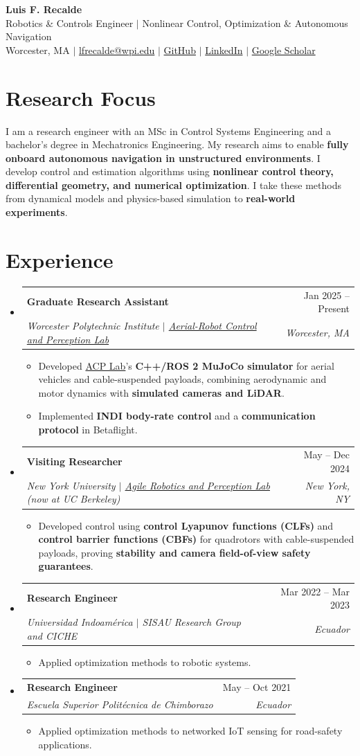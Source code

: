 \documentclass[letterpaper,11pt]{article}
\makeatletter
\newcommand{\resumeItem}[1]{
  \item {\small #1\par}\vspace{-2pt}
}
\newcommand{\resumeSubheading}[4]{
  \vspace{-2pt}\item
    \begin{tabular*}{0.97\textwidth}[t]{l@{\extracolsep{\fill}}r}
      \textbf{#1} & #2 \\
      \textit{\small#3} & \textit{\small #4} \\
    \end{tabular*}\vspace{-7pt}
}
\newcommand{\resumeSubHeadingListStart}{\begin{itemize}[leftmargin=0.15in, label={}, topsep=3pt]}
\newcommand{\resumeSubHeadingListEnd}{\end{itemize}}
\newcommand{\resumeItemListStart}{\begin{itemize}}
\newcommand{\resumeItemListEnd}{\end{itemize}\vspace{-5pt}}
\makeatother
\begin{document}
\begin{center}
\textcolor{AuthorTeal}{\textbf{\Huge Luis F. Recalde}} \\ \vspace{3pt}
\small Robotics \& Controls Engineer $|$ Nonlinear Control, Optimization \& Autonomous Navigation \\ \vspace{3pt}
Worcester, MA $|$ \href{mailto:lfrecalde@wpi.edu}{lfrecalde@wpi.edu} $|$
\href{https://github.com/lfrecalde1}{GitHub} $|$
\href{https://www.linkedin.com/in/luis-f-recalde-8a6432123}{LinkedIn} $|$
\href{https://scholar.google.com/citations?user=_v1511cAAAAJ}{Google Scholar}
\end{center}
\vspace{-12pt}
\section{Research Focus}
{\small I am a research engineer with an MSc in Control Systems Engineering and a bachelor's degree in Mechatronics Engineering.
My research aims to enable \textbf{fully onboard autonomous navigation in unstructured environments}.
I develop control and estimation algorithms using \textbf{nonlinear control theory, differential geometry, and numerical optimization}.
I take these methods from dynamical models and physics-based simulation to \textbf{real-world experiments}.\par}
\section{Experience}
\resumeSubHeadingListStart
\resumeSubheading{Graduate Research Assistant}{Jan 2025 -- Present}
{Worcester Polytechnic Institute $|$ \href{https://acp-lab.github.io/acplab-web/}{Aerial-Robot Control and Perception Lab}}{Worcester, MA}
\resumeItemListStart
\resumeItem{Developed \href{https://acp-lab.github.io/acplab-web/}{ACP Lab}'s \textbf{C++/ROS 2 MuJoCo simulator} for aerial vehicles and cable-suspended payloads, combining aerodynamic and motor dynamics with \textbf{simulated cameras and LiDAR}.}
\resumeItem{Implemented \textbf{INDI body-rate control} and a \textbf{communication protocol} in Betaflight.}
\resumeItemListEnd
\resumeSubheading{Visiting Researcher}{May -- Dec 2024}
{New York University $|$ \href{https://arplaboratory.github.io/}{Agile Robotics and Perception Lab} (now at UC Berkeley)}{New York, NY}
\resumeItemListStart
\resumeItem{Developed control using \textbf{control Lyapunov functions (CLFs)} and \textbf{control barrier functions (CBFs)} for quadrotors with cable-suspended payloads, proving \textbf{stability and camera field-of-view safety guarantees}.}
\resumeItemListEnd
\resumeSubheading{Research Engineer}{Mar 2022 -- Mar 2023}
{Universidad Indoam\'erica $|$ SISAU Research Group and CICHE}{Ecuador}
\resumeItemListStart
\resumeItem{Applied optimization methods to robotic systems.}
\resumeItemListEnd
\resumeSubheading{Research Engineer}{May -- Oct 2021}
{Escuela Superior Polit\'ecnica de Chimborazo}{Ecuador}
\resumeItemListStart
\resumeItem{Applied optimization methods to networked IoT sensing for road-safety applications.}
\resumeItemListEnd
\resumeSubHeadingListEnd
\end{document}
